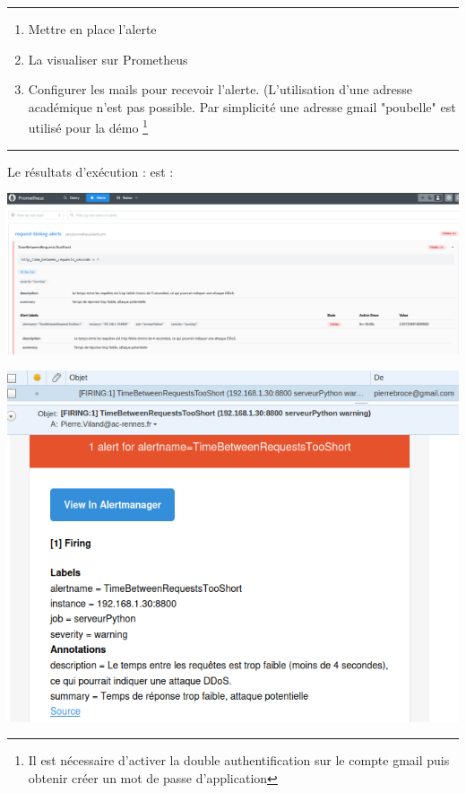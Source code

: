 \documentclass[french, 12pt]{article}%
\begin{document}
     
\begin{center}
 \rule{0.75\linewidth}{1pt}
 \end{center}

\begin{enumerate}[resume]
\item Mettre en place l'alerte
\item La visualiser sur Prometheus
\item Configurer les mails pour recevoir l'alerte. (L'utilisation d'une adresse académique n'est pas possible. Par simplicité une adresse gmail "poubelle" est utilisé pour la démo \footnote{Il est nécessaire d'activer la double authentification sur le compte gmail puis obtenir créer un mot de passe d'application}
\end{enumerate}

\begin{center}
 \rule{0.75\linewidth}{1pt}
 \end{center}
 


Le résultats d'exécution : est : 

\begin{center}
\includegraphics[scale=0.4]{./ressource/AlertPrometheuse}
\end{center}


\begin{center}
\includegraphics[scale=0.6]{./ressource/resMail}
\end{center} 
 
\end{document}
